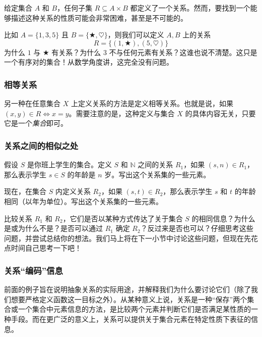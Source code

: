 \begin{remark}
    给定集合 $A$ 和 $B$，任何子集 $R \subseteq A \times B$ 都定义了一个关系。然而，要找到一个能够描述这种关系的性质可能会非常困难，甚至是不可能的。

    比如 $A=\{1,3,5\}$ 且 $B=\{\bigstar, \heartsuit\}$，则我们可以定义 $A, B$ 上的关系
    \[R=\{(1,\bigstar), (5, \heartsuit)\}\]
    为什么 $1$ 与 $\bigstar$ 有关系？为什么 $3$ 不与任何元素有关系？这谁也说不清楚。这只是一个有序对的集合！从数学角度讲，这完全没有问题。
\end{remark}

\subsubsection*{相等关系}

\begin{example} \label{ex:example6.2.9}
    另一种在任意集合 $X$ 上定义关系的方法是定义相等关系。也就是说，如果 $(x, y) \in R \iff x = y$。需要注意的是，这种定义与集合 $X$ 的具体内容无关，只要它是一个\emph{集合}即可。
\end{example}

\subsubsection*{关系之间的相似之处}

\begin{example}
    假设 $S$ 是你班上学生的集合。定义 $S$ 和 $\mathbb{N}$ 之间的关系 $R_1$，如果 $(s, n) \in R_1$，那么表示学生 $s \in S$ 的年龄是 $n$ 岁。写出这个关系集的一些元素。

    现在，在集合 $S$ 内定义关系 $R_2$，如果 $(s, t) \in R_2$，那么表示学生 $s$ 和 $t$ 的年龄相同（以年为单位）。写出这个关系集的一些元素。

    比较关系 $R_1$ 和 $R_2$，它们是否以某种方式传达了关于集合 $S$ 的相同信息？为什么是或为什么不是？是否可以通过 $R_1$ 确定 $R_2$？反过来是否也可以？仔细思考这些问题，并尝试总结你的想法。我们马上将在下一小节中讨论这些问题，但现在先花点时间自己思考一下吧！
\end{example}

\subsubsection*{关系``编码''信息}

前面的例子旨在说明抽象关系的实际用途，并解释我们为什么要讨论它们（除了我们想要严格定义函数这一目标之外）。从某种意义上说，关系是一种``保存''两个集合或一个集合中元素信息的方法，是比较两个元素并判断它们是否满足某性质的一种手段。而在更广泛的意义上，关系可以提供关于集合元素在特定性质下表征的信息。


